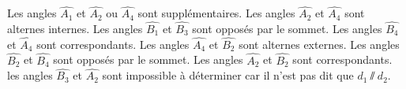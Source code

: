 %
%
    \begin{tasks}
        \task Les angles $\widehat{A_1}$ et $\widehat{A_2}$ ou $\widehat{A_4}$
        sont supplémentaires.
        \task Les angles $\widehat{A_2}$ et $\widehat{A_4}$ sont
        alternes internes.
        \task Les angles $\widehat{B_1}$ et $\widehat{B_3}$ sont opposés par
        le sommet.
        \task Les angles $\widehat{B_4}$ et $\widehat{A_4}$ sont correspondants.
        \task Les angles $\widehat{A_4}$ et $\widehat{B_2}$ sont
        alternes externes.
        \task Les angles $\widehat{B_2}$ et $\widehat{B_4}$ sont
        opposés par le sommet.
        \task Les angles $\widehat{A_2}$ et $\widehat{B_2}$ sont
        correspondants.
        \task les angles $\widehat{B_3}$ et $\widehat{A_2}$ sont impossible
        à déterminer car il n'est pas dit que $d_1\sslash d_2$.
    \end{tasks}
